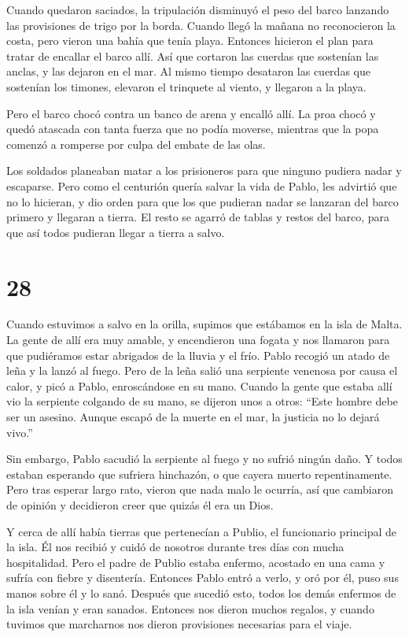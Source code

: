  Cuando quedaron saciados, la tripulación disminuyó el peso
del barco lanzando las provisiones de trigo por la borda. 
Cuando llegó la mañana no reconocieron la costa, pero vieron una bahía
que tenía playa. Entonces hicieron el plan para tratar de encallar el
barco allí.  Así que cortaron las cuerdas que sostenían las
anclas, y las dejaron en el mar. Al mismo tiempo desataron las cuerdas
que sostenían los timones, elevaron el trinquete al viento, y llegaron a
la playa.

 Pero el barco chocó contra un banco de arena y encalló
allí. La proa chocó y quedó atascada con tanta fuerza que no podía
moverse, mientras que la popa comenzó a romperse por culpa del embate de
las olas.

 Los soldados planeaban matar a los prisioneros para que
ninguno pudiera nadar y escaparse.  Pero como el centurión
quería salvar la vida de Pablo, les advirtió que no lo hicieran, y dio
orden para que los que pudieran nadar se lanzaran del barco primero y
llegaran a tierra.  El resto se agarró de tablas y restos
del barco, para que así todos pudieran llegar a tierra a salvo.

\hypertarget{section-27}{%
\section{28}\label{section-27}}

 Cuando estuvimos a salvo en la orilla, supimos que
estábamos en la isla de Malta.  La gente de allí era muy
amable, y encendieron una fogata y nos llamaron para que pudiéramos
estar abrigados de la lluvia y el frío.  Pablo recogió un
atado de leña y la lanzó al fuego. Pero de la leña salió una serpiente
venenosa por causa el calor, y picó a Pablo, enroscándose en su mano.
 Cuando la gente que estaba allí vio la serpiente colgando
de su mano, se dijeron unos a otros: ``Este hombre debe ser un asesino.
Aunque escapó de la muerte en el mar, la justicia no lo dejará vivo.''

 Sin embargo, Pablo sacudió la serpiente al fuego y no
sufrió ningún daño.  Y todos estaban esperando que sufriera
hinchazón, o que cayera muerto repentinamente. Pero tras esperar largo
rato, vieron que nada malo le ocurría, así que cambiaron de opinión y
decidieron creer que quizás él era un Dios.

 Y cerca de allí había tierras que pertenecían a Publio, el
funcionario principal de la isla. Él nos recibió y cuidó de nosotros
durante tres días con mucha hospitalidad.  Pero el padre de
Publio estaba enfermo, acostado en una cama y sufría con fiebre y
disentería. Entonces Pablo entró a verlo, y oró por él, puso sus manos
sobre él y lo sanó.  Después que sucedió esto, todos los
demás enfermos de la isla venían y eran sanados.  Entonces
nos dieron muchos regalos, y cuando tuvimos que marcharnos nos dieron
provisiones necesarias para el viaje.

